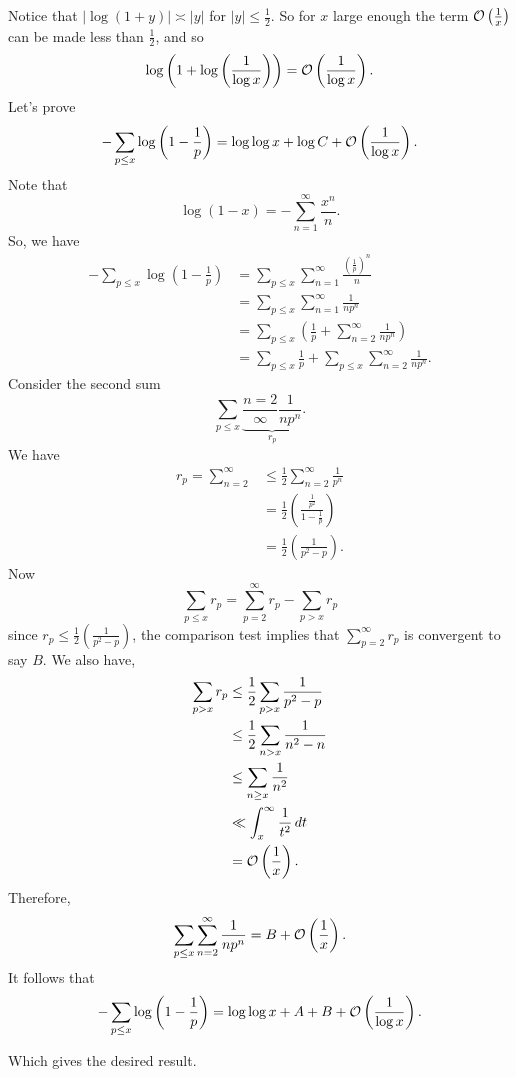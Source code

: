 \documentclass[12pt]{article}
\begin{document}
{\begin{enumerate}
        Notice that $|\log(1+y)|\asymp |y|$ for $|y|\leq\frac{1}{2}$. So for $x$ large enough the term $\mathcal{O}\left(\frac{1}{x}\right)$ can be made less than $\frac{1}{2}$, and so 
        \[
            \log\left(1+\log\left(\frac{1}{\log x}\right)\right)=\mathcal{O}\left(\frac{1}{\log x}\right).
        \]
        Let's prove
        \[
            -\sum_{p\leq x}\log\left(1-\frac{1}{p}\right)=\log\log x+\log C+\mathcal{O}\left(\frac{1}{\log x}\right).
        \]
        Note that 
        \[
            \log(1-x)=-\sum_{n=1}^{\infty}\frac{x^n}{n}.
        \]
        So, we have
        \begin{align*}
            -\sum_{p\leq x}\log\left(1-\frac{1}{p}\right)&=\sum_{p\leq x}\sum_{n=1}^{\infty}\frac{\left(\frac{1}{p}\right)^n}{n}\\
            &=\sum_{p\leq x}\sum_{n=1}^{\infty}\frac{1}{np^n}\\
            &=\sum_{p\leq x}\left(\frac{1}{p}+\sum_{n=2}^{\infty}\frac{1}{np^n}\right)\\
            &=\sum_{p\leq x}\frac{1}{p}+\sum_{p\leq x}\sum_{n=2}^{\infty}\frac{1}{np^n}.
        \end{align*}
        Consider the second sum
        \[
            \sum_{p\leq x}\underbrace{\frac{n=2}{\infty}\frac{1}{np^n}}_{r_p}.
        \]
        We have
        \begin{align*}
            r_p=\sum_{n=2}^{\infty}&\leq\frac{1}{2}\sum_{n=2}^{\infty}\frac{1}{p^n}\\
            &=\frac{1}{2}\left(\frac{\frac{1}{p^2}}{1-\frac{1}{p}}\right)\\
            &=\frac{1}{2}\left(\frac{1}{p^2-p}\right).
        \end{align*}
        Now 
        \[
            \sum_{p\leq x}r_p=\sum_{p=2}^{\infty}r_p-\sum_{p>x}r_p
        \]
        since $r_p\leq\frac{1}{2}\left(\frac{1}{p^2-p}\right)$, the comparison test implies that $\sum_{p=2}^{\infty}r_p$ is convergent to say $B$. We also have, 
        \begin{align*}
            \sum_{p>x}r_p&\leq\frac{1}{2}\sum_{p>x}\frac{1}{p^2-p}\\
            &\leq\frac{1}{2}\sum_{n>x}\frac{1}{n^2-n}\\
            &\leq\sum_{n\geq x}\frac{1}{n^2}\\
            &\ll\int_{x}^{\infty}\frac{1}{t^2}\,dt\\
            &=\mathcal{O}\left(\frac{1}{x}\right).
        \end{align*}
        Therefore,
        \[
            \sum_{p\leq x}\sum_{n=2}^{\infty}\frac{1}{np^n}=B+\mathcal{O}\left(\frac{1}{x}\right).
        \]
        It follows that
        \[
            -\sum_{p\leq x}\log\left(1-\frac{1}{p}\right)=\log\log x+A+B+\mathcal{O}\left(\frac{1}{\log x}\right).
        \]
    \end{enumerate}
    Which gives the desired result.
}
\end{document}
